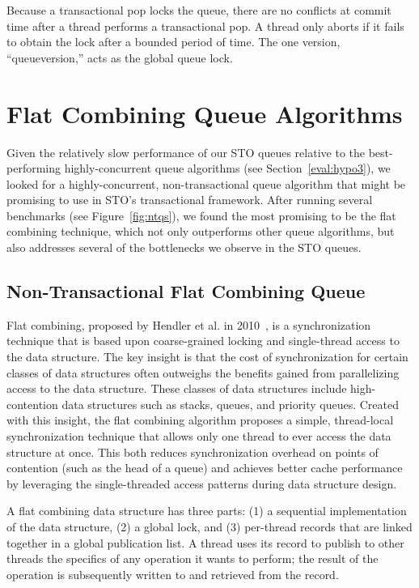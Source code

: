 Because a transactional pop locks the queue, there are no conflicts at commit time after a thread performs a transactional pop. A thread only aborts if it fails to obtain the lock after a bounded period of time. The one version, ``queueversion,'' acts as the global queue lock. 


\section{Flat Combining Queue Algorithms}
Given the relatively slow performance of our STO queues relative to the best-performing highly-concurrent queue algorithms (see Section~\ref{eval:hypo3}), we looked for a highly-concurrent, non-transactional queue algorithm that might be promising to use in STO's transactional framework. After running several benchmarks (see Figure~\ref{fig:ntqs}), we found the most promising to be the flat combining technique, which not only outperforms other queue algorithms, but also addresses several of the bottlenecks we observe in the STO queues.

\subsection{Non-Transactional Flat Combining Queue}
\label{fcqueuent}

Flat combining, proposed by Hendler et al. in 2010~\cite{flatcombining}, is a synchronization technique that is based upon coarse-grained locking and single-thread access to the data structure. The key insight is that the cost of synchronization for certain classes of data structures often outweighs the benefits gained from parallelizing access to the data structure. These classes of data structures include high-contention data structures such as stacks, queues, and priority queues. Created with this insight, the flat combining algorithm proposes a simple, thread-local synchronization technique that allows only one thread to ever access the data structure at once. This both reduces synchronization overhead on points of contention (such as the head of a queue) and achieves better cache performance by leveraging the single-threaded access patterns during data structure design.

A flat combining data structure has three parts: (1) a sequential implementation of the data structure, (2) a global lock, and (3) per-thread records that are linked together in a global publication list. A thread uses its record to publish to other threads the specifics of any operation it wants to perform; the result of the operation is subsequently written to and retrieved from the record.

